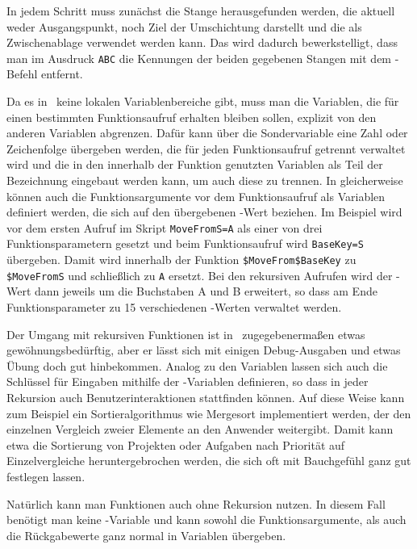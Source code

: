 In jedem Schritt muss zunächst die Stange herausgefunden werden, die aktuell weder Ausgangspunkt, noch Ziel der Umschichtung darstellt und die als Zwischenablage verwendet werden kann. Das wird dadurch bewerkstelligt, dass man im Ausdruck \verb|ABC| die Kennungen der beiden gegebenen Stangen mit dem -Befehl entfernt.

Da es in \FPZ\ keine lokalen Variablenbereiche gibt, muss man die Variablen, die für einen bestimmten Funktionsaufruf erhalten bleiben sollen, explizit von den anderen Variablen abgrenzen. Dafür kann über die Sondervariable  eine Zahl oder Zeichenfolge übergeben werden, die für jeden Funktionsaufruf getrennt verwaltet wird und die in den innerhalb der Funktion genutzten Variablen als Teil der Bezeichnung eingebaut werden kann, um auch diese zu trennen. In gleicherweise können auch die Funktionsargumente vor dem Funktionsaufruf als Variablen definiert werden, die sich auf den übergebenen -Wert beziehen. Im Beispiel wird vor dem ersten Aufruf im Skript \verb|MoveFromS=A| als einer von drei Funktionsparametern gesetzt und beim Funktionsaufruf wird \verb|BaseKey=S| übergeben. Damit wird innerhalb der Funktion \verb|$MoveFrom$BaseKey| zu \verb|$MoveFromS| und schließlich zu \verb|A| ersetzt. Bei den rekursiven Aufrufen wird der -Wert dann jeweils um die Buchstaben A und B erweitert, so dass am Ende Funktionsparameter zu 15 verschiedenen -Werten verwaltet werden.

Der Umgang mit rekursiven Funktionen ist in \FPZ\ zugegebenermaßen etwas gewöhnungsbedürftig, aber er lässt sich mit einigen Debug-Ausgaben und etwas Übung doch gut hinbekommen. Analog zu den Variablen lassen sich auch die Schlüssel für Eingaben mithilfe der -Variablen definieren, so dass in jeder Rekursion auch Benutzerinteraktionen stattfinden können. Auf diese Weise kann zum Beispiel ein Sortieralgorithmus wie Mergesort implementiert werden, der den einzelnen Vergleich zweier Elemente an den Anwender weitergibt. Damit kann etwa die Sortierung von Projekten oder Aufgaben nach Priorität auf Einzelvergleiche heruntergebrochen werden, die sich oft mit Bauchgefühl ganz gut festlegen lassen.

Natürlich kann man Funktionen auch ohne Rekursion nutzen. In diesem Fall benötigt man keine -Variable und kann sowohl die Funktionsargumente, als auch die Rückgabewerte ganz normal in Variablen übergeben.

